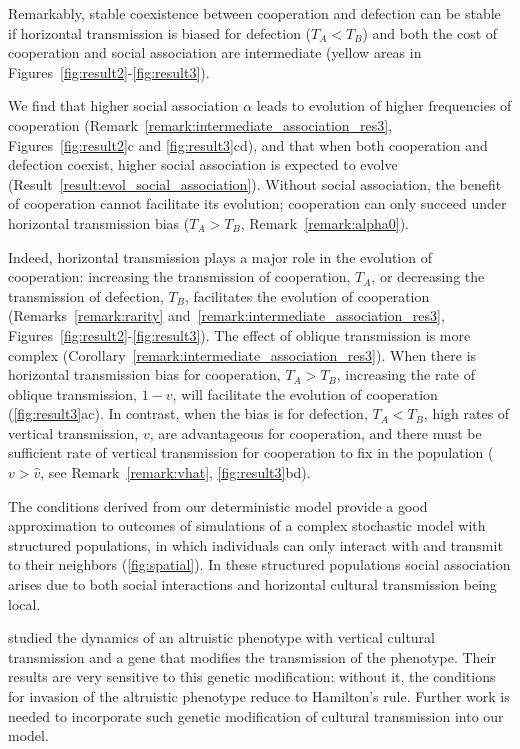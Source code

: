 \documentclass[12pt]{extarticle}
\begin{document}
Remarkably, stable coexistence between cooperation and defection can be stable if horizontal transmission is biased for defection ($T_A<T_B$) and both the cost of cooperation and social association are intermediate (yellow areas in Figures~\ref{fig:result2}-\ref{fig:result3}).

We find that higher social association $\alpha$ leads to evolution of higher frequencies of cooperation (Remark~\autoref{remark:intermediate_association_res3}, Figures~\ref{fig:result2}c and \ref{fig:result3}cd), and that when both cooperation and defection coexist, higher social association is expected to evolve (Result~\ref{result:evol_social_association}).
Without social association, the benefit of cooperation cannot facilitate its evolution; cooperation can only succeed under horizontal transmission bias ($T_A>T_B$, Remark~\ref{remark:alpha0}). 

Indeed, horizontal transmission plays a major role in the evolution of cooperation: increasing the transmission of cooperation, $T_A$, or decreasing the transmission of defection, $T_B$, facilitates the evolution of cooperation (Remarks~\ref{remark:rarity} and~\ref{remark:intermediate_association_res3}, Figures~\ref{fig:result2}-\ref{fig:result3}). 
The effect of oblique transmission is more complex (Corollary~\ref{remark:intermediate_association_res3}). 
When there is horizontal transmission bias for cooperation, $T_A>T_B$, increasing the rate of oblique transmission, $1-v$, will facilitate the evolution of cooperation (\autoref{fig:result3}ac).
In contrast, when the bias is for defection, $T_A<T_B$, high rates of vertical transmission, $v$, are advantageous for cooperation, and there must be sufficient rate of vertical transmission for cooperation to fix in the population ($v>\hat v$, see Remark~\autoref{remark:vhat}, \autoref{fig:result3}bd).

The conditions derived from our deterministic model provide a good approximation to outcomes of simulations of a complex stochastic model with structured populations, in which individuals can only interact with and transmit to their neighbors (\autoref{fig:spatial}).
In these structured populations social association arises due to both social interactions and horizontal cultural transmission being local.

\citet{feldman1985gene} studied the dynamics of an altruistic phenotype with vertical cultural transmission and a gene that modifies the transmission of the phenotype. Their results are very sensitive to this genetic modification: without it, the conditions for invasion of the altruistic phenotype reduce to Hamilton's rule.
Further work is needed to incorporate such genetic modification of cultural transmission into our model.
\end{document}
